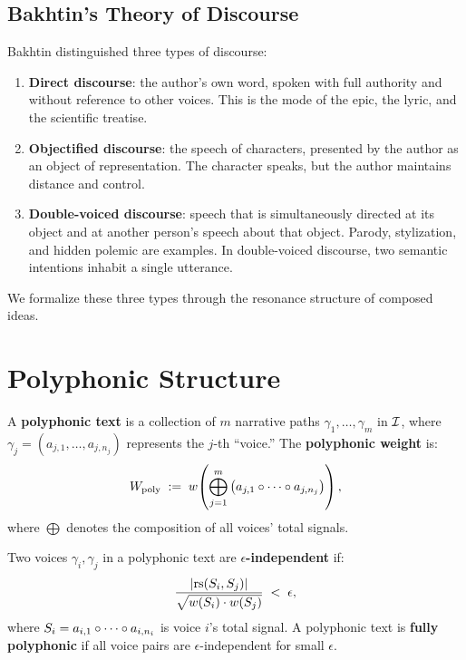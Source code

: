 \subsection{Bakhtin's Theory of Discourse}

Bakhtin distinguished three types of discourse:

\begin{enumerate}
\item \textbf{Direct discourse}: the author's own word, spoken with full
authority and without reference to other voices.  This is the mode of the epic,
the lyric, and the scientific treatise.

\item \textbf{Objectified discourse}: the speech of characters, presented by
the author as an object of representation.  The character speaks, but the
author maintains distance and control.

\item \textbf{Double-voiced discourse}: speech that is simultaneously directed
at its object and at another person's speech about that object.  Parody,
stylization, and hidden polemic are examples.  In double-voiced discourse, two
semantic intentions inhabit a single utterance.
\end{enumerate}

We formalize these three types through the resonance structure of composed ideas.


\section{Polyphonic Structure}

\begin{definition}
\label{def:polyphonic}
A \textbf{polyphonic text} is a collection of $m$ narrative paths
$\gamma_1, \ldots, \gamma_m$ in $\mathcal{I}$, where $\gamma_j = (a_{j,1}, \ldots,
a_{j,n_j})$ represents the $j$-th ``voice.''  The \textbf{polyphonic weight}
is:
\[
  W_{\mathrm{poly}} \;:=\; w\!\left(\bigoplus_{j=1}^{m}
  \left(a_{j,1} \circ \cdots \circ a_{j,n_j}\right)\right),
\]
where $\bigoplus$ denotes the composition of all voices' total signals.
\end{definition}

\begin{definition}
\label{def:voice-independence}
Two voices $\gamma_i, \gamma_j$ in a polyphonic text are \textbf{$\epsilon$-independent}
if:
\[
  \frac{|\mathrm{rs}(S_i, S_j)|}{\sqrt{w(S_i) \cdot w(S_j)}} \;<\; \epsilon,
\]
where $S_i = a_{i,1} \circ \cdots \circ a_{i,n_i}$ is voice $i$'s total
signal.  A polyphonic text is \textbf{fully polyphonic} if all voice pairs are
$\epsilon$-independent for small $\epsilon$.
\end{definition}

